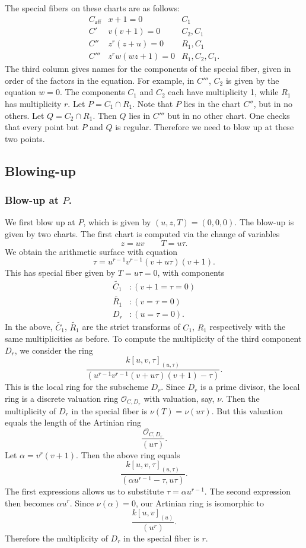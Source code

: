 \documentclass{article}
\newcommand{\caff}{C_{\textsf{aff}}}
\theoremstyle{plain}
\theoremstyle{definition}
\theoremstyle{remark}
\renewcommand{\tilde}[1]{\widetilde{#1}}
\newcommand{\sO}{\ensuremath{\mathscr{O}}}
\begin{document}
The special fibers on these charts are as follows:
\[
\begin{array}{lll}
\caff & x + 1 = 0 & C_1 \\
C' & v(v + 1) = 0 & C_2, C_1 \\
C'' & z^r(z + u) = 0 & R_1, C_1 \\
C''' & z^rw(wz+1) = 0 & R_1, C_2, C_1.
\end{array}
\]
The third column gives names for the components of the special fiber, given in order of the factors in the equation. For example, in $C'''$, $C_2$ is given by the equation $w = 0$. The components $C_1$ and $C_2$ each have multiplicity 1, while $R_1$ has multiplicity $r$. Let $P = C_1 \cap R_1$. Note that $P$ lies in the chart $C''$, but in no others. Let $Q = C_2 \cap R_1$. Then $Q$ lies in $C'''$ but in no other chart. One checks that every point but $P$ and $Q$ is regular. Therefore we need to blow up at these two points.

\subsection{Blowing-up}
\label{sec:blowing-up}

\subsubsection{Blow-up at $P$.}
\label{sec:blow-up-P}

We first blow up at $P$, which is given by $(u,z,T) = (0,0,0)$. The blow-up is given by two charts. The first chart is computed via the change of variables
\[
z = uv \qquad T = u\tau.
\]
We obtain the arithmetic surface with equation
\[
\tau = u^{r-1}v^{r-1}(v + u\tau)(v + 1).
\]
This has special fiber given by $T = u\tau = 0$, with components
\begin{align*}
  \tilde{C_1}&: (v + 1 = \tau = 0) \\
  \tilde{R_1}&: (v = \tau = 0) \\
  D_r&: (u = \tau = 0).
\end{align*}
In the above, $\tilde{C_1}$, $\tilde{R_1}$ are the strict transforms of $C_1$, $R_1$ respectively with the same multiplicities as before. To compute the multiplicity of the third component $D_r$, we consider the ring
\[
\frac{k[u,v,\tau]_{(u,\tau)}}{(u^{r-1}v^{r-1}(v + u\tau)(v + 1) - \tau)}.
\]
This is the local ring for the subscheme $D_r$. Since $D_r$ is a prime divisor, the local ring is a discrete valuation ring $\sO_{C,D_r}$ with valuation, say, $\nu$. Then the multiplicity of $D_r$ in the special fiber is $\nu(T) = \nu(u\tau)$. But this valuation equals the length of the Artinian ring
\[
\frac{\sO_{C,D_r}}{(u\tau)}.
\]
Let $\alpha = v^{r}(v+1)$. Then the above ring equals
\[
\frac{k[u,v,\tau]_{(u,\tau)}}{(\alpha u^{r-1} - \tau, u\tau)}.
\]
The first expressions allows us to substitute $\tau = \alpha u^{r-1}$. The second expression then becomes $\alpha u^r$. Since $\nu(\alpha) = 0$, our Artinian ring is isomorphic to
\[
\frac{k[u,v]_{(u)}}{(u^r)}.
\]
Therefore the multiplicity of $D_r$ in the special fiber is $r$.
\end{document}
